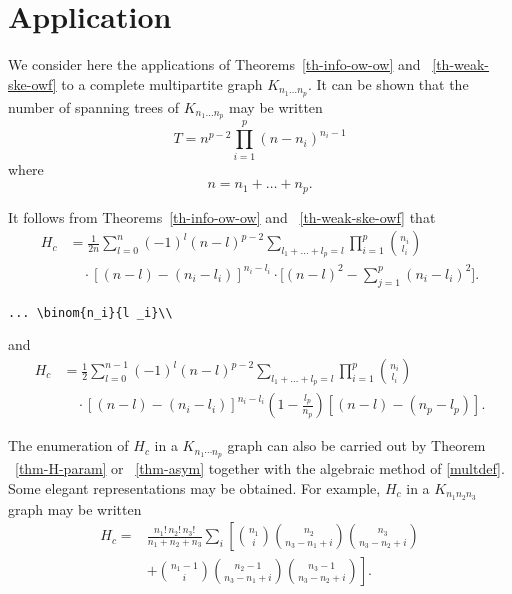 \section{Application}
\label{lincomp}

We consider here the applications of Theorems~\ref{th-info-ow-ow} and
~\ref{th-weak-ske-owf} to a complete
multipartite graph $K_{n_1\dots n_p}$. It can be shown that the
number of spanning trees of $K_{n_1\dots n_p}$
may be written
\begin{equation}\label{e:st}
T=n^{p-2}\prod^p_{i=1}
(n-n_i)^{n_i-1}
\end{equation}
where
\begin{equation}
n=n_1+\dots+n_p.
\end{equation}

It follows from Theorems~\ref{th-info-ow-ow} and
~\ref{th-weak-ske-owf} that
\begin{equation}\label{e:barwq}
\begin{split}
H_c&=\frac1{2n}
\sum^n_{{l}=0}(-1)^{l}(n-{l})^{p-2}
\sum_{l _1+\dots+l _p=l}\prod^p_{i=1}
\binom{n_i}{l _i}\\
&\quad\cdot[(n-l )-(n_i-l _i)]^{n_i-l _i}\cdot
\biggl[(n-l )^2-\sum^p_{j=1}(n_i-l _i)^2\biggr].\end{split}
\end{equation}
%
\begin{verbatim}
... \binom{n_i}{l _i}\\
\end{verbatim}
and
\begin{equation}\label{joe}
\begin{split}
H_c&=\frac12\sum^{n-1}_{l =0}
(-1)^{l}(n-l )^{p-2}
\sum_{l _1+\dots+l _p=l}
\prod^p_{i=1}\binom{n_i}{l _i}\\
&\quad\cdot[(n-l )-(n_i-l _i)]^{n_i-l _i}
\left(1-\frac{l _p}{n_p}\right)
[(n-l )-(n_p-l _p)].
\end{split}
\end{equation}

The enumeration of $H_c$ in a $K_{n_1\dotsm n_p}$ graph can also be
carried out by Theorem ~\ref{thm-H-param} or ~\ref{thm-asym}
together with the algebraic method of \eqref{multdef}.
Some elegant representations may be obtained. For example, $H_c$ in
a $K_{n_1n_2n_3}$ graph may be written
\begin{equation}\label{j:mark}
\begin{split}
H_c=&
\frac{n_1!\,n_2!\,n_3!}
{n_1+n_2+n_3}\sum_i\left[\binom{n_1}{i}
\binom{n_2}{n_3-n_1+i}\binom{n_3}{n_3-n_2+i}\right.\\
&+\left.\binom{n_1-1}{i}
\binom{n_2-1}{n_3-n_1+i}
\binom{n_3-1}{n_3-n_2+i}\right].\end{split}
\end{equation}

